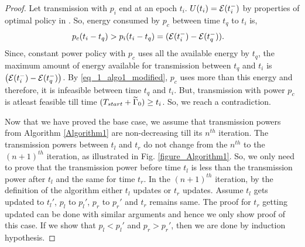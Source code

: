 \begin{proof}
Let transmission with $p_i$ end at an epoch $t_i$. $U(t_i)=\mathcal{E}(t_i^-)$ by properties of optimal policy in \cite{Yang}. So, energy consumed by $p_c$ between time $t_q$ to $t_i$ is, 
\begin{align}
&p_c(t_i-t_q)>p_i(t_i-t_q)=(\ETx(t_i^-)-\ETx(t_q^-)).\label{eq_1_algo1_modified}
\end{align}
Since, constant power policy with $p_c$ uses all the available energy by $t_q$, the maximum amount of energy available for transmission between $t_q$ and $t_i$ is $\left(\mathcal{E}(t_i^-)-\mathcal{E}(t_q^-)\right)$. By \eqref{eq_1_algo1_modified}, $p_c$ uses more than this energy and therefore, it is infeasible between time $t_q$ and $t_i$. But, transmission with power $p_c$ is atleast feasible till time $(T_{start}+\widetilde{\Gamma}_0)\ge t_i$. So, we reach a contradiction.        
%

Now that we have proved the base case, we assume that transmission powers from Algorithm \ref{Algorithm1} are non-decreasing till its $n^{th}$ iteration. The transmission powers between $t_l$ and $t_r$ do not change from the $n^{th}$ to the $(n+1)^{th}$ iteration, as illustrated in Fig. \ref{figure_Algorithm1}. So, we only need to prove that the transmission power before time $t_l$ is less than the transmission power after $t_l$ and the same for time $t_r$. In the $(n+1)^{th}$ iteration, by the definition of the algorithm either $t_l$ updates or $t_{r}$ updates. Assume $t_l$ gets updated to $t_{l}'$, $p_l$ to $p_l'$, $p_r$ to $p_r'$ and $t_r$ remains same. The proof for $t_r$ getting updated can be done with similar arguments and hence we only show proof of this case. If we show that $p_l<p_l'$ and $p_r>p_r'$, then we are done by induction hypothesis.


\end{proof}

